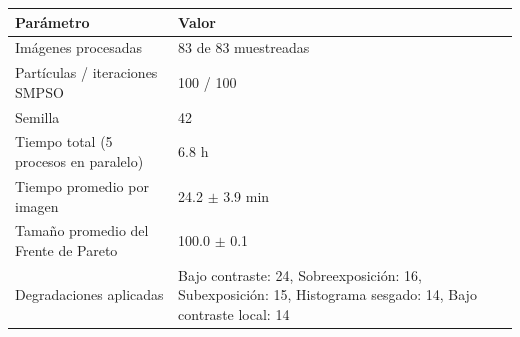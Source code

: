 \begin{tabular}{ll}
\hline
\textbf{Parámetro} & \textbf{Valor} \\
\hline
Imágenes procesadas & 83 de 83 muestreadas \\
Partículas / iteraciones SMPSO & 100 / 100 \\
Semilla & 42 \\
Tiempo total (5 procesos en paralelo) & 6.8 h \\
Tiempo promedio por imagen & 24.2 $\pm$ 3.9 min \\
Tamaño promedio del Frente de Pareto & 100.0 $\pm$ 0.1 \\
Degradaciones aplicadas & Bajo contraste: 24, Sobreexposición: 16, Subexposición: 15, Histograma sesgado: 14, Bajo contraste local: 14 \\
\hline
\end{tabular}